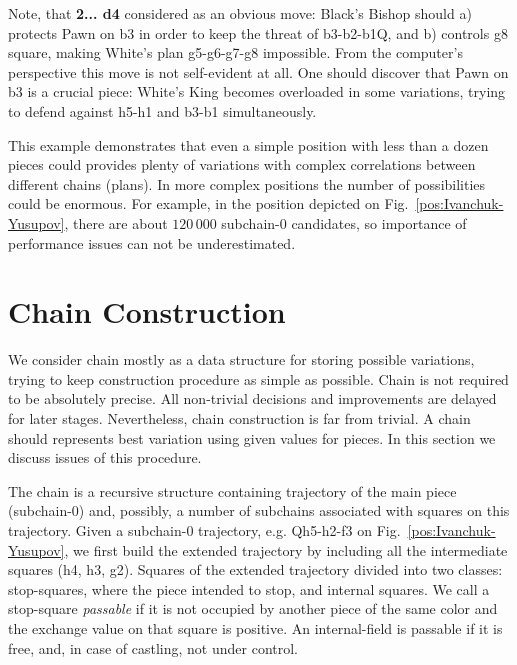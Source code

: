 \documentclass{llncs}
\begin{document}
Note, that {\bf 2... d4} considered as an obvious move: Black's Bishop
should a) protects Pawn on b3 in order to keep the threat of
b3-b2-b1Q, and b) controls g8 square, making White's plan g5-g6-g7-g8
impossible. From the computer's perspective this move is not
self-evident at all. One should discover that Pawn on b3 is a crucial
piece: White's King becomes overloaded in some variations, trying to
defend against h5-h1 and b3-b1 simultaneously.

This example demonstrates that even a simple position with less than a
dozen pieces could provides plenty of variations with complex
correlations between different chains (plans). In more complex
positions the number of possibilities could be enormous. For example,
in the position depicted on Fig.~\ref{pos:Ivanchuk-Yusupov}, there are
about $120\,000$ subchain-0 candidates, so importance of performance
issues can not be underestimated.

\section{Chain Construction}
We consider chain mostly as a data structure for storing possible
variations, trying to keep construction procedure as simple as
possible. Chain is not required to be absolutely precise. All
non-trivial decisions and improvements are delayed for later
stages. Nevertheless, chain construction is far from trivial. A chain
should represents best variation using given values for pieces. In
this section we discuss issues of this procedure.

The chain is a recursive structure containing trajectory of the main
piece (subchain-0) and, possibly, a number of subchains associated
with squares on this trajectory. Given a subchain-0 trajectory,
e.g. Qh5-h2-f3 on Fig.~\ref{pos:Ivanchuk-Yusupov}, we first build the
extended trajectory by including all the intermediate squares (h4, h3,
g2). Squares of the extended trajectory divided into two classes:
stop-squares, where the piece intended to stop, and internal
squares. We call a stop-square \emph{passable} if it is not occupied
by another piece of the same color and the exchange value on that
square is positive. An internal-field is passable if it is free, and,
in case of castling, not under control.
\end{document}
